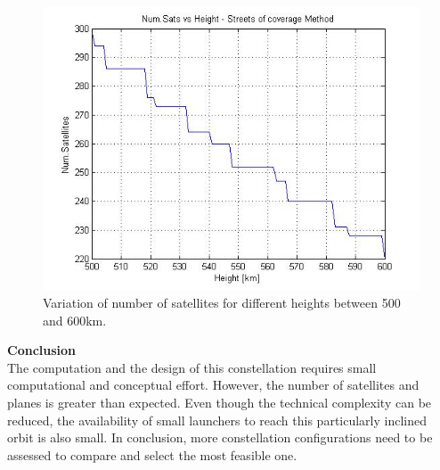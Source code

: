 \begin{figure}[H]
\begin{center}
\includegraphics[scale=0.7]{PolarOrbits/Polar.jpg}
\caption{Variation of number of satellites for different heights between 500 and 600km.}
\end{center}
\end{figure}

\textbf{Conclusion}\\
The computation and the design of this constellation requires small computational and conceptual effort. However, the number of satellites and planes is greater than expected. Even though the technical complexity can be reduced, the availability of small launchers to reach this particularly inclined orbit is also small. In conclusion, more constellation configurations need to be assessed to compare and select the most feasible one.

%
%